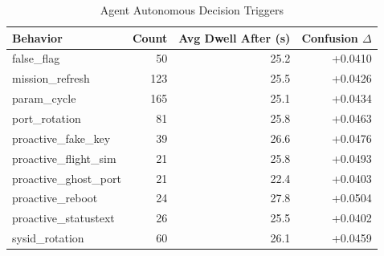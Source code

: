 \begin{table}[t]
\centering
\caption{Agent Autonomous Decision Triggers}
\label{tab:agent-decisions}
\begin{tabular}{lrrr}
\toprule
Behavior & Count & Avg Dwell After (s) & Confusion $\Delta$ \\
\midrule
false_flag & 50 & 25.2 & +0.0410 \\
mission_refresh & 123 & 25.5 & +0.0426 \\
param_cycle & 165 & 25.1 & +0.0434 \\
port_rotation & 81 & 25.8 & +0.0463 \\
proactive_fake_key & 39 & 26.6 & +0.0476 \\
proactive_flight_sim & 21 & 25.8 & +0.0493 \\
proactive_ghost_port & 21 & 22.4 & +0.0403 \\
proactive_reboot & 24 & 27.8 & +0.0504 \\
proactive_statustext & 26 & 25.5 & +0.0402 \\
sysid_rotation & 60 & 26.1 & +0.0459 \\
\bottomrule
\end{tabular}
\end{table}